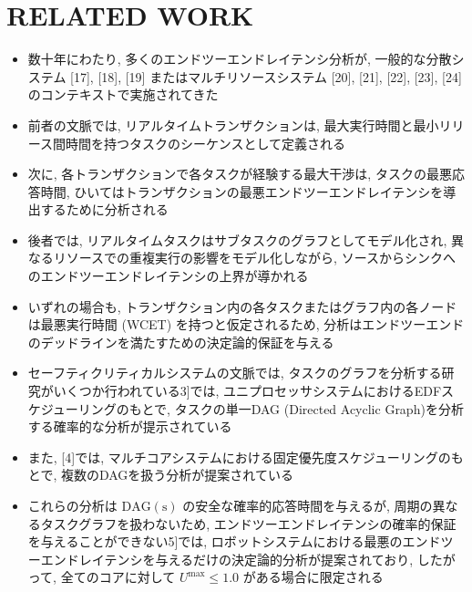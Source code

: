 
\section{RELATED WORK}
\label{sec: related work}

\begin{frame}{}
    \begin{itemize}
        \item 数十年にわたり, 多くのエンドツーエンドレイテンシ分析が, 一般的な分散システム [17], [18], [19] またはマルチリソースシステム [20], [21], [22], [23], [24] のコンテキストで実施されてきた
\item 前者の文脈では, リアルタイムトランザクションは, 最大実行時間と最小リリース間時間を持つタスクのシーケンスとして定義される
\item 次に, 各トランザクションで各タスクが経験する最大干渉は, タスクの最悪応答時間, ひいてはトランザクションの最悪エンドツーエンドレイテンシを導出するために分析される
\item 後者では, リアルタイムタスクはサブタスクのグラフとしてモデル化され, 異なるリソースでの重複実行の影響をモデル化しながら, ソースからシンクへのエンドツーエンドレイテンシの上界が導かれる
\item いずれの場合も, トランザクション内の各タスクまたはグラフ内の各ノードは最悪実行時間 (WCET) を持つと仮定されるため, 分析はエンドツーエンドのデッドラインを満たすための決定論的保証を与える
    \end{itemize}
\end{frame}

\begin{frame}{}
    \begin{itemize}
        \item セーフティクリティカルシステムの文脈では, タスクのグラフを分析する研究がいくつか行われている3]では, ユニプロセッサシステムにおけるEDFスケジューリングのもとで, タスクの単一DAG (Directed Acyclic Graph)を分析する確率的な分析が提示されている
\item また, [4]では, マルチコアシステムにおける固定優先度スケジューリングのもとで, 複数のDAGを扱う分析が提案されている
\item これらの分析は $\mathrm{DAG}(\mathrm{s})$ の安全な確率的応答時間を与えるが, 周期の異なるタスクグラフを扱わないため, エンドツーエンドレイテンシの確率的保証を与えることができない5]では, ロボットシステムにおける最悪のエンドツーエンドレイテンシを与えるだけの決定論的分析が提案されており, したがって, 全てのコアに対して $U^{\max } \leq 1.0$ がある場合に限定される
    \end{itemize}
\end{frame}


